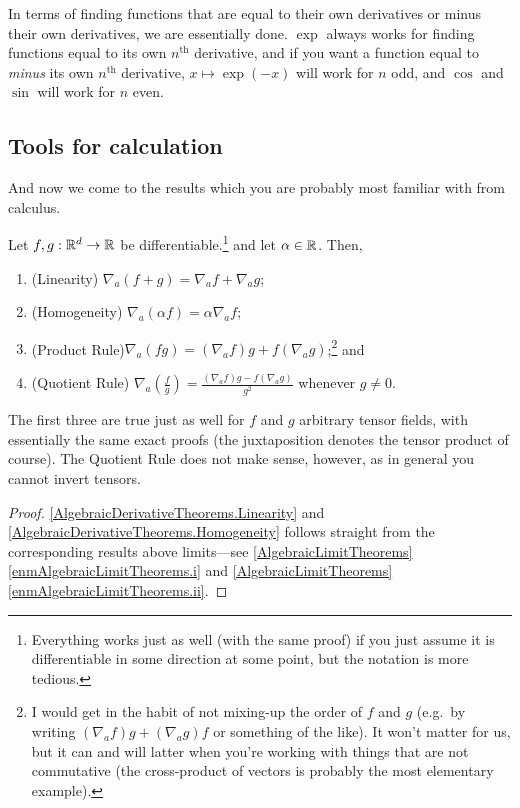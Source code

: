 In terms of finding functions that are equal to their own derivatives or minus their own derivatives, we are essentially done.  $\exp$ always works for finding functions equal to its own $n^{\text{th}}$ derivative, and if you want a function equal to \emph{minus} its own $n^{\text{th}}$ derivative, $x\mapsto \exp (-x)$ will work for $n$ odd, and $\cos$ and $\sin$ will work for $n$ even.

\subsection{Tools for calculation}

And now we come to the results which you are probably most familiar with from calculus.
\begin{prp}\label{AlgebraicDerivativeTheorems}
Let $f,g:\mathbb{R} ^d\rightarrow \mathbb{R}$ be differentiable.\footnote{Everything works just as well (with the same proof) if you just assume it is differentiable in some direction at some point, but the notation is more tedious.} and let $\alpha \in \mathbb{R}$.  Then,
\begin{enumerate}
\item \label{AlgebraicDerivativeTheorems.Linearity}(Linearity) $\nabla _a(f+g)=\nabla _af+\nabla _ag$;
\item \label{AlgebraicDerivativeTheorems.Homogeneity}(Homogeneity) $\nabla _a(\alpha f)=\alpha \nabla _af$;
\item \label{AlgebraicDerivativeTheorems.ProductRule}(Product Rule)$\nabla _a(fg)=(\nabla _af)g+f(\nabla _ag)$;\footnote{I would get in the habit of not mixing-up the order of $f$ and $g$ (e.g.~by writing $(\nabla _af)g+(\nabla _ag)f$ or something of the like).  It won't matter for us, but it can and will latter when you're working with things that are not commutative (the cross-product of vectors is probably the most elementary example).} and
\item \label{AlgebraicDerivativeTheorems.QuotientRule}(Quotient Rule) $\nabla _a\left( \frac{f}{g}\right) =\frac{(\nabla _af)g-f(\nabla _ag)}{g^2}$ whenever $g\neq 0$.
\end{enumerate}
\begin{rmk}
The first three are true just as well for $f$ and $g$ arbitrary tensor fields, with essentially the same exact proofs (the juxtaposition denotes the tensor product of course).  The Quotient Rule does not make sense, however, as in general you cannot invert tensors.
\end{rmk}
\begin{proof}
\ref{AlgebraicDerivativeTheorems.Linearity} and \ref{AlgebraicDerivativeTheorems.Homogeneity} follows straight from the corresponding results above limits---see \cref{AlgebraicLimitTheorems}\ref{enmAlgebraicLimitTheorems.i} and \cref{AlgebraicLimitTheorems}\ref{enmAlgebraicLimitTheorems.ii}.


\end{proof}
\end{prp}
